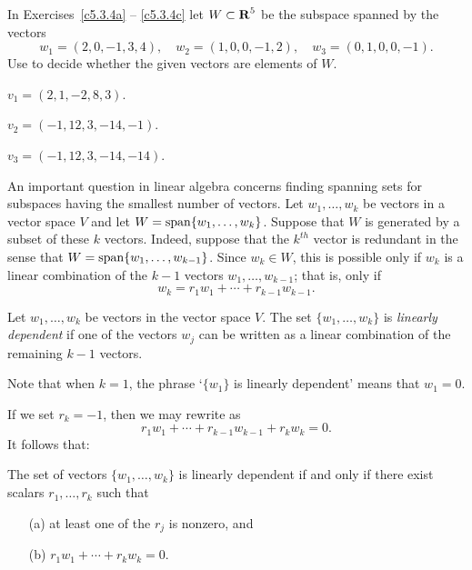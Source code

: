 \noindent In Exercises~\ref{c5.3.4a} -- \ref{c5.3.4c} let $W\subset\mbox{$\bf{R}$}^5$
be the subspace spanned by the vectors
\begin{equation*}
     w_1=(2,0,-1,3,4),\quad w_2=(1,0,0,-1,2),\quad w_3=(0,1,0,0,-1).
\end{equation*}
Use \Matlab to decide whether the given vectors are elements of $W$.
\begin{exercise} \label{c5.3.4a}
$v_1=(2,1,-2,8,3)$.
\end{exercise}
\begin{exercise} \label{c5.3.4b}
$v_2=(-1,12,3,-14,-1)$.
\end{exercise}
\begin{exercise} \label{c5.3.4c}
$v_3=(-1,12,3,-14,-14)$.
\end{exercise}

 \label{S:5.4}

An important question in linear algebra concerns finding spanning
sets for subspaces having the smallest
number of vectors. Let $w_1,\ldots,w_k$ be vectors in a vector
space $V$ and let $W={\rm span}\{w_1,\ldots,w_k\}$.  
Suppose that $W$ is generated by a subset of these $k$ vectors.
Indeed, suppose that the $k^{th}$ vector is redundant in the
sense that $W={\rm span}\{w_1,\ldots,w_{k-1}\}$.  Since $w_k\in W$,
this is possible only if $w_k$ is a linear combination of the
$k-1$ vectors $w_1,\ldots,w_{k-1}$; that is, only if
\begin{equation}  \label{e:depend}
w_k = r_1w_1 + \cdots + r_{k-1}w_{k-1}.
\end{equation}
\begin{Def}  \label{lineardependence}
Let $w_1,\ldots,w_k$ be vectors in the vector space $V$.  The set
$\{w_1,\ldots,w_k\}$ is {\em linearly dependent\/} if one of the vectors
$w_j$ can be written as a linear combination of the remaining $k-1$ vectors.
\end{Def}  
Note that when $k=1$, the phrase `$\{w_1\}$ is linearly dependent'
means that $w_1=0$.

If we set $r_k=-1$, then we may rewrite  as
\[
r_1w_1 + \cdots + r_{k-1}w_{k-1} + r_k w_k =0.
\]
It follows that:
\begin{lemma}  \label{L:lindep}
The set of vectors $\{w_1,\ldots,w_k\}$ is linearly dependent if and
only if there exist scalars $r_1,\ldots,r_k$ such that
\begin{itemize}
\item[(a)]   at least one of the $r_j$ is nonzero, and
\item[(b)]   $r_1w_1 + \cdots + r_k w_k =0.$
\end{itemize}
\end{lemma}

